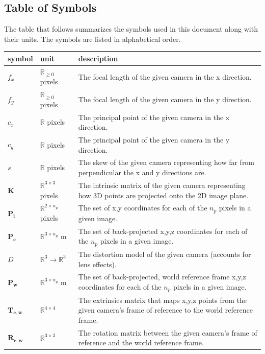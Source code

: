 \documentclass[12pt]{article}
\begin{document}
\subsection{Table of Symbols}

The table that follows summarizes the symbols used in this document along with
their units. The symbols are listed in alphabetical order.

\renewcommand{\arraystretch}{1.2}
\noindent \begin{longtable*}{l l p{12cm}} \toprule
\textbf{symbol} & \textbf{unit} & \textbf{description}\\
\midrule 
$f_x$ & $\mathbb{R}_{\geq0}$ pixels & The focal length of the given camera in the x direction.
\\
$f_y$ & $\mathbb{R}_{\geq0}$ pixels & The focal length of the given camera in the y direction.
\\
$c_x$ & $\mathbb{R}$ pixels & The principal point of the given camera in the x direction.
\\
$c_y$ & $\mathbb{R}$ pixels & The principal point of the given camera in the y direction.
\\
$s$ & $\mathbb{R}$ pixels & The skew of the given camera representing how far from perpendicular the x and y directions are.
\\
$\mathbf{K}$ & $\mathbb{R}^{3\times3}$ pixels & The intrinsic matrix of the given camera representing how 3D points are projected onto the 2D image plane.
\\
$\mathbf{P_i}$ & $\mathbb{R}^{2\times{}n_p}$ pixels & The set of x,y coordinates for each of the $n_p$ pixels in a given image.
\\
$\mathbf{P_c}$ & $\mathbb{R}^{3\times{}n_p}$ m & The set of back-projected x,y,z coordinates for each of the $n_p$ pixels in a given image.
\\
$D$ & $\mathbb{R}^{3}\rightarrow{}\mathbb{R}^{3}$ & The distortion model of the given camera (accounts for lens effects).
\\
$\mathbf{P_w}$ & $\mathbb{R}^{3\times{}n_p}$ m & The set of back-projected, world reference frame x,y,z coordinates for each of the $n_p$ pixels in a given image.
\\
$\mathbf{T_{c,w}}$ & $\mathbb{R}^{4\times{}4}$ & The extrinsics matrix that maps x,y,z points from the given camera's frame of reference to the world reference frame.
\\ 
$\mathbf{R_{c,w}}$ & $\mathbb{R}^{3\times3}$ & The rotation matrix between the given camera's frame of reference and the world reference frame.

\end{longtable*}
\end{document}
